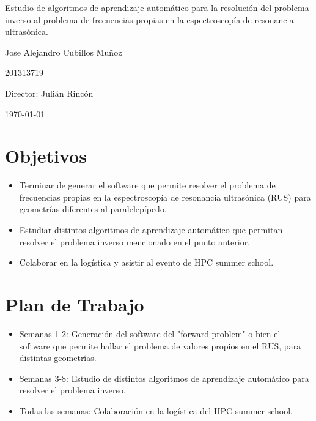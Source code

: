 \documentclass[12pt]{article}
\begin{document}
\begin{center}
\Huge
Estudio de algoritmos de aprendizaje automático para la resolución del problema inverso al problema de frecuencias propias en la espectroscopía de resonancia ultrasónica. 

\vspace{3mm}
\Large Jose Alejandro Cubillos Muñoz

\large
201313719


\vspace{2mm}
\Large
Director: Julián Rincón

\normalsize
\vspace{2mm}

\today
\end{center}


\normalsize

\section{Objetivos}
\begin{itemize}
    \item Terminar de generar el software que permite resolver el problema de frecuencias propias en la espectroscopía de resonancia ultrasónica (RUS) para geometrías diferentes al paralelepípedo.
    \item Estudiar distintos algoritmos de aprendizaje automático que permitan resolver el problema inverso mencionado en el punto anterior. 
    \item Colaborar en la logística y asistir al evento de HPC summer school. 
\end{itemize}

\section{Plan de Trabajo}
\begin{itemize}
    \item Semanas 1-2: Generación del software del "forward problem" o bien el software que permite hallar el problema de valores propios en el RUS, para distintas geometrías.
    \item Semanas 3-8: Estudio de distintos algoritmos de aprendizaje automático para resolver el problema inverso.
    \item Todas las semanas: Colaboración en la logística del HPC summer school. 
\end{itemize}








\vspace{1.5cm}
\end{document}
